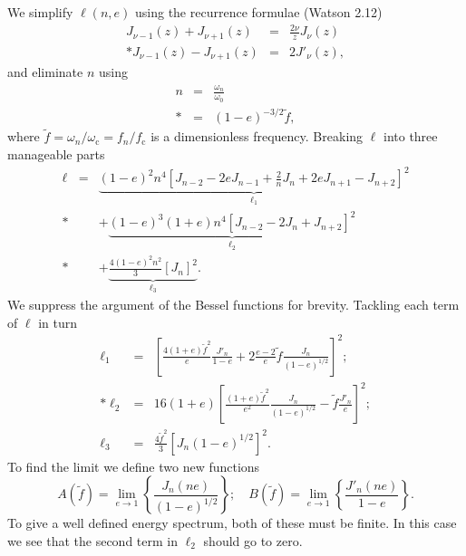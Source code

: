 \documentclass[aps,prd,reprint,showpacs,groupedaddress]{revtex4-1}
\newcommand{\sub}[1]{\ensuremath{_\text{#1}}}
\begin{document}
We simplify $\ell(n,e)$ using the recurrence formulae (Watson\cite{Watson1995} 2.12)
\begin{eqnarray}
J_{\nu-1}(z) + J_{\nu+1}(z) & = & \frac{2\nu}{z}J_\nu(z)\\*
J_{\nu-1}(z) - J_{\nu+1}(z) & = & 2J'_\nu(z),
\end{eqnarray}
and eliminate $n$ using
\begin{eqnarray}
n & = & \frac{\omega_n}{\omega_0} \nonumber \\*
& = & (1-e)^{-3/2}\tilde{f},
\end{eqnarray}
where $\tilde{f} = \omega_n/\omega\sub{c} = f_n/f\sub{c}$ is a dimensionless frequency. Breaking $\ell$ into three manageable parts
\begin{eqnarray}
\ell & = & \underbrace{(1-e)^2n^4\left[J_{n-2} - 2eJ_{n-1} + \frac{2}{n}J_n + 2eJ_{n+1} - J_{n+2}\right]^2}_{\ell_1} \nonumber \\*
 & & + \underbrace{(1-e)^3(1+e)n^4\left[J_{n-2} - 2J_n + J_{n+2}\right]^2}_{\ell_2} \nonumber \\*
 & & + \underbrace{\frac{4(1-e)^2n^2}{3}\left[J_n\right]^2}_{\ell_3}.
\end{eqnarray}
We suppress the argument of the Bessel functions for brevity. Tackling each term of $\ell$ in turn
\begin{eqnarray}
\ell_1 & = & \left[\frac{4(1+e)\tilde{f}^2}{e}\frac{J'_n}{1-e} + 2\frac{e-2}{e}\tilde{f}\frac{J_n}{(1-e)^{1/2}}\right]^2;\\*
\ell_2 & = & 16(1+e)\left[\frac{(1+e)\tilde{f}^2}{e^2}\frac{J_n}{(1-e)^{1/2}} - \tilde{f}\frac{J'_n}{e}\right]^2;\\
\ell_3 & = & \frac{4\tilde{f}^2}{3}\left[{J_n}{(1-e)^{1/2}}\right]^2.
\end{eqnarray}
To find the limit we define two new functions
\begin{equation}
A(\tilde{f}) = \lim_{e\rightarrow 1}\left\{\frac{J_n(ne)}{(1-e)^{1/2}}\right\}; \quad B(\tilde{f}) = \lim_{e\rightarrow 1}\left\{\frac{J'_n(ne)}{1-e}\right\}.
\end{equation}
To give a well defined energy spectrum, both of these must be finite. In this case we see that the second term in $\ell_2$ should go to zero.
\end{document}
